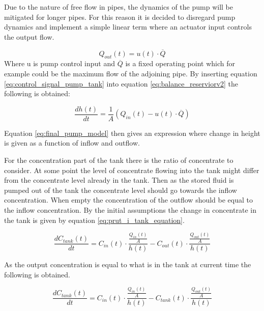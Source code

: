 Due to the nature of free flow in pipes, the dynamics of the pump will be mitigated for longer pipes. For this reason it is decided to disregard pump dynamics and implement a simple linear term where an actuator input controls the output flow.

\begin{equation} \label{eq:control_signal_pump_tank}
	Q_{out}(t) = u(t) \cdot \overline Q
\end{equation}
Where u is pump control input and $\overline Q$ is a fixed operating point which for example could be the maximum flow of the adjoining pipe. By inserting equation \ref{eq:control_signal_pump_tank} into equation \ref{eq:balance_reserviorv2} the following is obtained:

\begin{equation}\label{eq:final_pump_model}
 \boxed{ 	\frac{dh(t)}{dt}=\frac{1}{A} \left(Q_{in}(t)-u(t) \cdot \overline Q \right) }
\end{equation}

Equation \ref{eq:final_pump_model} then gives an expression where change in height is given as a function of inflow and outflow. 

For the concentration part of the tank there is the ratio of concentrate to consider. At some point the level of concentrate flowing into the tank might differ from the concentrate level already in the tank. Then as the stored fluid is pumped out of the tank the concentrate level should go towards the inflow concentration. When empty the concentration of the outflow should be equal to the inflow concentration. By the initial assumptions the change in concentrate in the tank is given by equation \ref{eq:prut_i_tank_equation}.

\begin{equation} \label{eq:prut_i_tank_equation}
	\frac{dC_{tank}(t)}{dt} = C_{in}(t) \cdot \frac{\frac{Q_{in}(t)}{A}}{h(t)} - C_{out}(t) \cdot \frac{\frac{Q_{out}(t)}{A}}{h(t)}   
\end{equation}

As the output concentration is equal to what is in the tank at current time the following is obtained.

\begin{equation} \label{eq:prut_i_tank_equation2}
\boxed{	\frac{dC_{tank}(t)}{dt} = C_{in}(t) \cdot \frac{\frac{Q_{in}(t)}{A}}{h(t)} - C_{tank}(t) \cdot \frac{\frac{Q_{out}(t)}{A}}{h(t)} }  
\end{equation}

